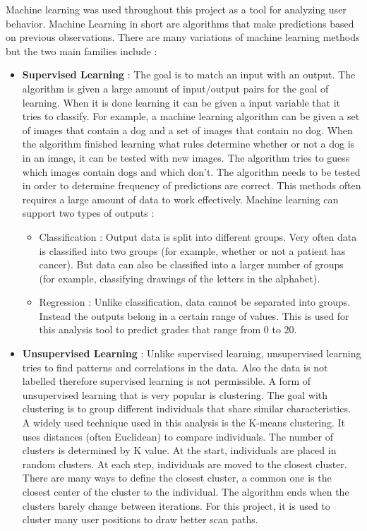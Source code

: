 \documentclass[a4paper,11pt]{report}
\numberwithin{figure}{chapter} %
\begin{document}
    Machine learning was used throughout this project as a tool for analyzing user behavior.
    Machine Learning in short are algorithms that make predictions based on previous observations.
    There are many variations of machine learning methods but the two main families include :
    \begin{itemize}
        \item[\textbullet] \textbf{Supervised Learning} : The goal is to match an input with an output.
        The algorithm is given a large amount of input/output pairs for the goal of learning.
        When it is done learning it can be given a input variable that it tries to classify.
        For example, a machine learning algorithm can be given a set of images that contain a dog and a set of images that contain no dog.
        When the algorithm finished learning what rules determine whether or not a dog is in an image, it can be tested with new images.
        The algorithm tries to guess which images contain dogs and which don't.
        The algorithm needs to be tested in order to determine frequency of predictions are correct.
        This methods often requires a large amount of data to work effectively.
        Machine learning can support two types of outputs :
        \begin{itemize}
            \item Classification : Output data is split into different groups.
            Very often data is classified into two groups (for example, whether or not a patient has cancer).
            But data can also be classified into a larger number of groups (for example, classifying drawings of the letters in the alphabet).
            \item Regression : Unlike classification, data cannot be separated into groups.
            Instead the outputs belong in a certain range of values.
            This is used for this analysis tool to predict grades that range from 0 to 20.
        \end{itemize}
        \item[\textbullet] \textbf{Unsupervised Learning} : Unlike supervised learning, unsupervised learning tries to find patterns and correlations in the data.
        Also the data is not labelled therefore supervised learning is not permissible.
        A form of unsupervised learning that is very popular is clustering.
        The goal with clustering is to group different individuals that share similar characteristics.
        A widely used technique used in this analysis is the K-means clustering.
        It uses distances (often Euclidean) to compare individuals.
        The number of clusters is determined by K value.
        At the start, individuals are placed in random clusters.
        At each step, individuals are moved to the closest cluster.
        There are many ways to define the closest cluster, a common one is the closest center of the cluster to the individual.
        The algorithm ends when the clusters barely change between iterations.
        For this project, it is used to cluster many user positions to draw better scan paths.
    \end{itemize}
\end{document}
